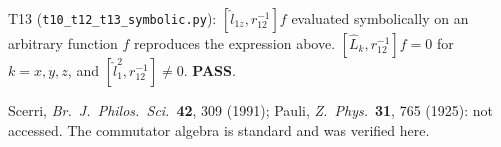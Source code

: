 \begin{verifybox}
T13 (\texttt{t10\_t12\_t13\_symbolic.py}): $[\hat l_{1z},r_{12}^{-1}]f$ evaluated symbolically on an arbitrary
function $f$ reproduces the expression above. $[\hat L_k,r_{12}^{-1}]f=0$ for $k=x,y,z$, and $[\hat l_1^2,r_{12}^{-1}]\neq0$. \textbf{PASS}.
\end{verifybox}
\begin{sourcebox}
Scerri, \emph{Br.\ J.\ Philos.\ Sci.}\ \textbf{42}, 309 (1991); Pauli, \emph{Z.\ Phys.}\ \textbf{31}, 765 (1925): not
accessed. The commutator algebra is standard and was verified here.
\end{sourcebox}
